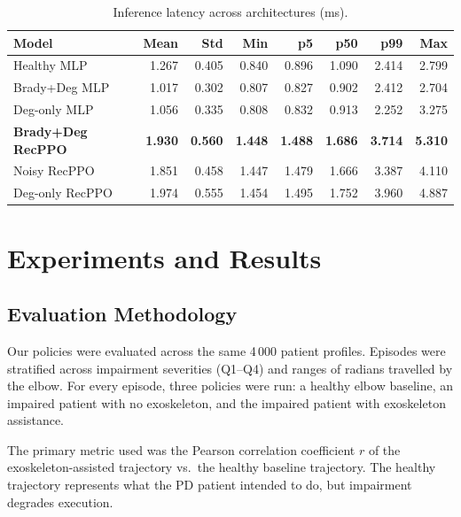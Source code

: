\documentclass[letterpaper]{article} %
\begin{document}
\begin{table}[tbp]
  \centering
  \caption{Inference latency across architectures (ms).}
  \label{tab:latency}
  \small
  \begin{tabular}{lrrrrrrr}
    \toprule
    \textbf{Model} & \textbf{Mean} & \textbf{Std} & \textbf{Min}
      & \textbf{p5} & \textbf{p50} & \textbf{p99} & \textbf{Max} \\
    \midrule
    Healthy MLP               & 1.267 & 0.405 & 0.840 & 0.896 & 1.090 & 2.414 & 2.799 \\
    Brady+Deg MLP             & 1.017 & 0.302 & 0.807 & 0.827 & 0.902 & 2.412 & 2.704 \\
    Deg-only MLP              & 1.056 & 0.335 & 0.808 & 0.832 & 0.913 & 2.252 & 3.275 \\
    \textbf{Brady+Deg RecPPO} & \textbf{1.930} & \textbf{0.560}
      & \textbf{1.448} & \textbf{1.488} & \textbf{1.686}
      & \textbf{3.714} & \textbf{5.310} \\
    Noisy RecPPO              & 1.851 & 0.458 & 1.447 & 1.479 & 1.666 & 3.387 & 4.110 \\
    Deg-only RecPPO           & 1.974 & 0.555 & 1.454 & 1.495 & 1.752 & 3.960 & 4.887 \\
    \bottomrule
  \end{tabular}
\end{table}

\section{Experiments and Results}
\label{sec:results}

\subsection{Evaluation Methodology}

Our policies were evaluated across the same 4\,000 patient profiles.
Episodes were stratified across impairment severities (Q1--Q4) and ranges of
radians travelled by the elbow.
For every episode, three policies were run: a healthy elbow baseline, an impaired
patient with no exoskeleton, and the impaired patient with exoskeleton
assistance.

The primary metric used was the Pearson correlation coefficient $r$ of the
exoskeleton-assisted trajectory vs.\ the healthy baseline trajectory.
The healthy trajectory represents what the PD patient intended to do, but
impairment degrades execution.
\end{document}
